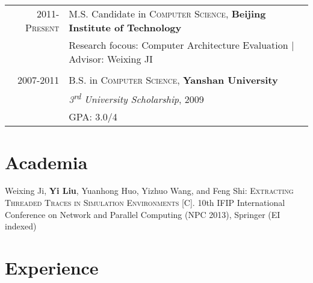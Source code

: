 \documentclass[a4paper,10pt]{article} %
\begin{document}
\begin{tabular}{rl}	
\textsc{2011-Present} & M.S. Candidate in \textsc{Computer Science}, \textbf{Beijing Institute of Technology} \\
& Research focous: Computer Architecture Evaluation | \small Advisor: Weixing JI\\
&\\


\textsc{2007-2011} & B.S. in \textsc{Computer Science}, \textbf{Yanshan University}\\
& \small\emph{3\textsuperscript{rd} University Scholarship}, 2009 \\
& \textsc{GPA}: 3.0/4 \\
\end{tabular}

\section{Academia}
Weixing Ji, \textbf{Yi Liu}, Yuanhong Huo, Yizhuo Wang, and Feng Shi: \textsc{Extracting Threaded Traces in Simulation Environments [C].}  10th IFIP International Conference on Network and Parallel Computing (NPC 2013), Springer (EI indexed)

\nopagebreak



\section{Experience}
\end{document}
